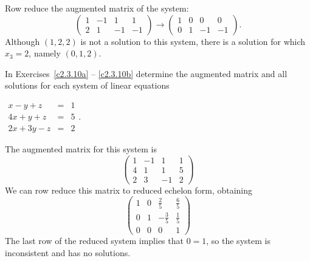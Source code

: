 \documentclass{ximera}
\begin{document}
\begin{exercise}
\begin{solution}
\soln Row reduce the augmented matrix of the system:
\[
\left(\begin{array}{rrr|r} 1 & -1 & 1 & 1 \\ 2 & 1 & -1 & -1\end{array}\right)
\longrightarrow
\left(\begin{array}{rrr|r} 1 & 0 & 0 & 0 \\ 0 & 1 & -1 & -1\end{array}\right).
\]
Although $(1,2,2)$ is not a solution to this system, there is a solution
for which $x_3 = 2$, namely $(0,1,2)$.

\end{solution}
\end{exercise}

\noindent In Exercises~\ref{c2.3.10a} -- \ref{c2.3.10b} determine the
augmented matrix and all solutions for each system of linear equations
\begin{exercise} \label{c2.3.10a}
$\begin{array}{rcl}
x-y+z & = & 1 \\
4x+y+z & = & 5 \\
   2x+3y-z & = & 2 \end{array}$.

\begin{solution}
The augmented matrix for this system is
\[
\left(\begin{array}{rrr|r} 1 & -1 & 1 & 1 \\ 4 & 1 & 1 & 5 \\
2 & 3 & -1 & 2\end{array}\right)
\]
We can row reduce this matrix to reduced echelon form, obtaining
\[
\left(\begin{array}{rrr|r} 1 & 0 & \frac{2}{5} & \frac{6}{5} \\
0 & 1 & -\frac{3}{5} & \frac{1}{5} \\ 0 & 0 & 0 & 1\end{array}\right)
\]
The last row of the reduced system implies that $0 = 1$, so the system
is inconsistent and has no solutions.

\end{solution}
\end{exercise}
\end{document}
